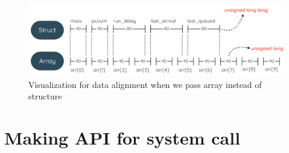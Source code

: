 \documentclass[a4paper]{article}
\begin{document}
\begin{center}
    \begin{figure}[H]
    \begin{center}
     \includegraphics[scale=0.6]{array_struct.png}
    \end{center}
    \caption{Visualization for data alignment when we pass array instead of structure}
    \end{figure}
\end{center}
\section{Making API for system call}
\end{document}
